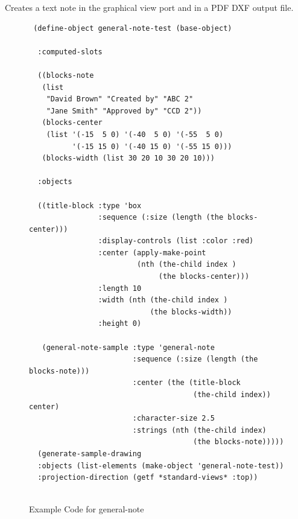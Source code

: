 \documentclass [11pt]{book}
\begin{document}
\begin{itemize}
\begin{description}
Creates a text note in the graphical view port and in a PDF DXF output file.



\end{description}




\begin{figure}
\begin{lrbox}{\boxedverb}
\begin{minipage}{\linewidth}
{\small

\begin{verbatim} 
 (define-object general-note-test (base-object)
  
  :computed-slots
  
  ((blocks-note 
   (list
    "David Brown" "Created by" "ABC 2"
    "Jane Smith" "Approved by" "CCD 2"))
   (blocks-center 
    (list '(-15  5 0) '(-40  5 0) '(-55  5 0)
          '(-15 15 0) '(-40 15 0) '(-55 15 0)))
   (blocks-width (list 30 20 10 30 20 10)))
  
  :objects 
  
  ((title-block :type 'box
                :sequence (:size (length (the blocks-center)))
                :display-controls (list :color :red)
                :center (apply-make-point 
                         (nth (the-child index ) 
                              (the blocks-center)))
                :length 10
                :width (nth (the-child index ) 
                            (the blocks-width))
                :height 0)

   (general-note-sample :type 'general-note
                        :sequence (:size (length (the blocks-note)))
                        :center (the (title-block 
                                      (the-child index)) center)
                        :character-size 2.5
                        :strings (nth (the-child index) 
                                      (the blocks-note)))))
  (generate-sample-drawing 
  :objects (list-elements (make-object 'general-note-test)) 
  :projection-direction (getf *standard-views* :top))


\end{verbatim}}
\end{minipage}
\end{lrbox}
\fbox{\usebox{\boxedverb}}

\caption{Example Code for general-note}

\label{fig:example-code-general-note}

\end{figure}


\end{itemize}
\end{document}

